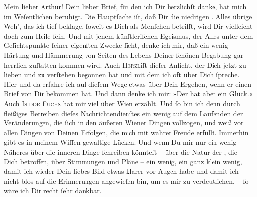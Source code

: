 \pstart\center{}Mein lieber Arthur!\pend\vspace{0.5em}
\pstart
           Dein lieber Brief, für den ich Dir herzlichſt danke, hat mich im Weſentlichen
               beruhigt. Die Hauptſache iſt, daß Dir die niedrigen \label{K_L02708-1v}\label{K_L02708-1}. Alles übrige Weh’, das ich tief
               beklage,{ }ſoweit es Dich als Menſchen betrifft, wird Dir vielleicht doch zum Heile{ }ſein. Und mit jenem künſtleriſchen Egoismus, der Alles unter dem Geſichtspunkte{ }ſeiner eigenſten Zwecke{ }ſieht, denke ich mir, daß ein wenig Härtung und Hämmerung von
               Seiten des Lebens Deiner{ }ſchönen Begabung gar herrlich zuſtatten kommen wird. Auch
                  \textsc{Herzl}{\pb}iſt dieſer Anficht, der Dich jetzt zu lieben und zu verſtehen begonnen hat und mit dem ich oft über Dich{ }ſpreche. Hier und da erfahre ich auf dieſem Wege etwas über Dein Ergehen, wenn er
               einen Brief von Dir bekommen hat. Und dann denke ich mir: »Der hat aber ein Glück.«
               Auch \textsc{Isidor Fuchs} hat mir viel über Wien erzählt. Und{ }ſo  bin ich denn durch fleißiges  Betreiben dieſes Nachrichtendienſtes ein wenig auf
               dem Laufenden der Veränderungen, die{ }ſich in den äußeren Wiener Dingen vollzogen, und weiß vor allen Dingen von Deinen
               Erfolgen, die mich mit wahrer Freude {\pb}erfüllt.
               Immerhin gibt es in meinem Wiſſen gewaltige Lücken. Und wenn Du mir nur ein wenig
               Näheres über die inneren Dinge{ }ſchreiben könnteſt – über die Natur der \label{K_L02708-2v}\label{K_L02708-2}, die Dich betroffen, über Stimmungen und
               Pläne – ein wenig, ein ganz klein wenig, damit ich wieder Dein liebes Bild etwas
               klarer vor Augen habe und damit ich nicht blos auf die Erinnerungen angewieſen bin,
               um es mir zu verdeutlichen, –{ }ſo wäre ich Dir recht{ }ſehr dankbar.\pend
           
